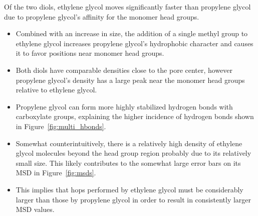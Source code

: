 \documentclass{article}
\begin{document}
  Of the two diols, ethylene glycol moves significantly faster than propylene glycol
  due to propylene glycol's affinity for the monomer head groups.  
  \begin{itemize}
    \item Combined with an increase in size, the addition of a single methyl group to ethylene glycol
    increases propylene glycol's hydrophobic character and causes it to favor positions
    near monomer head groups.
    \item Both diols have comparable densities close to the pore center, however propylene glycol's
    density has a large peak near the monomer head groups relative to ethylene glycol.
    \item Propylene glycol can form more highly stabilized hydrogen bonds with carboxylate groups,
    explaining the higher incidence of hydrogen bonds shown in Figure~\ref{fig:multi_hbonds}.
    \item Somewhat counterintuitively, there is a relatively high density of ethylene
    glycol molecules beyond the head group region probably due to its relatively small size.
    This likely contributes to the somewhat large error bars on its MSD in Figure~\ref{fig:msds}. 
    \item This implies that hops performed by ethylene glycol must be considerably larger
    than those by propylene glycol in order to result in consistently larger MSD values.
  \end{itemize}
  
  
\end{document}
